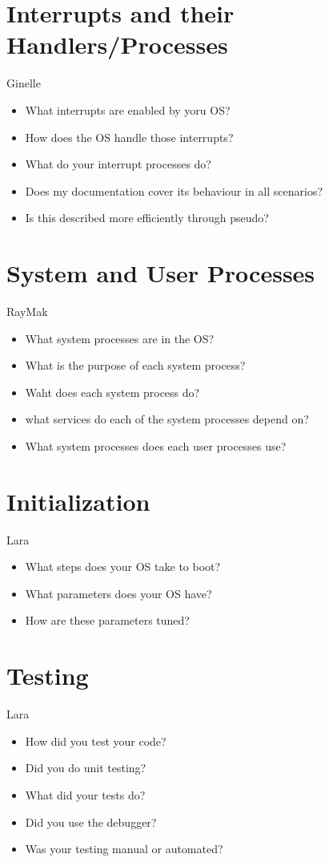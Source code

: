 \documentclass[11pt, oneside]{article}
\begin{document}
\section{Interrupts and their Handlers/Processes}
Ginelle
\begin{itemize}
\item What interrupts are enabled by yoru OS?
\item How does the OS handle those interrupts?
\item What do your interrupt processes do?
\item Does my documentation cover its behaviour in all scenarios?
\item Is this described more efficiently through pseudo?
\end{itemize}

\section{System and User Processes}
RayMak
\begin{itemize}
\item What system processes are in the OS?
\item What is the purpose of each system process?
\item Waht does each system process do?
\item what services do each of the system processes depend on?
\item What system processes does each user processes use?
\end{itemize}

\section{Initialization}
Lara
\begin{itemize}
\item What steps does your OS take to boot?
\item What parameters does your OS have?
\item How are these parameters tuned?
\end{itemize}

\section{Testing}
Lara
\begin{itemize}
\item How did you test your code?
\item Did you do unit testing?
\item What did your tests do?
\item Did you use the debugger?
\item Was your testing manual or automated?
\end{itemize}
\end{document}
